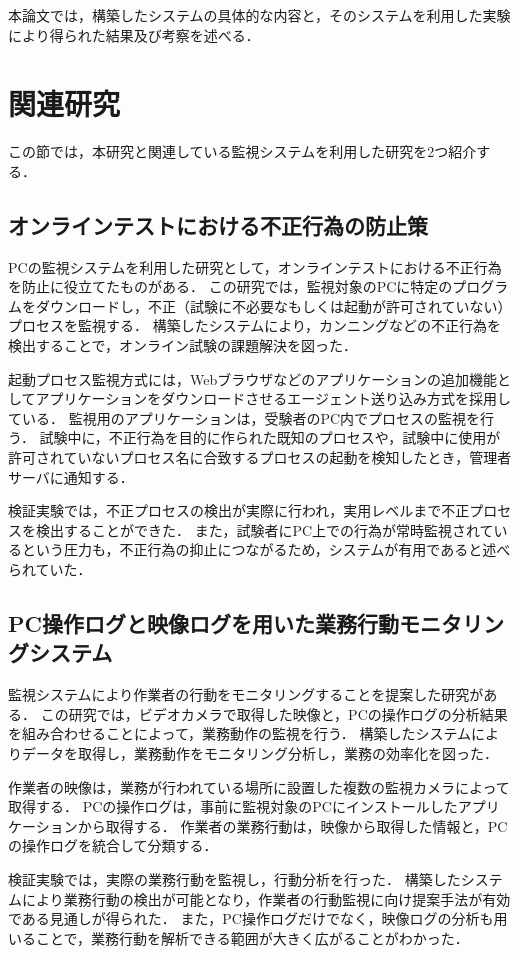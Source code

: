 本論文では，構築したシステムの具体的な内容と，そのシステムを利用した実験により得られた結果及び考察を述べる．

\section{関連研究}
この節では，本研究と関連している監視システムを利用した研究を2つ紹介する．

\subsection{オンラインテストにおける不正行為の防止策}
PCの監視システムを利用した研究として，オンラインテストにおける不正行為を防止に役立てたものがある．
この研究では，監視対象のPCに特定のプログラムをダウンロードし，不正（試験に不必要なもしくは起動が許可されていない）プロセスを監視する．
構築したシステムにより，カンニングなどの不正行為を検出することで，オンライン試験の課題解決を図った．

起動プロセス監視方式には，Webブラウザなどのアプリケーションの追加機能としてアプリケーションをダウンロードさせるエージェント送り込み方式を採用している．
監視用のアプリケーションは，受験者のPC内でプロセスの監視を行う．
試験中に，不正行為を目的に作られた既知のプロセスや，試験中に使用が許可されていないプロセス名に合致するプロセスの起動を検知したとき，管理者サーバに通知する．

検証実験では，不正プロセスの検出が実際に行われ，実用レベルまで不正プロセスを検出することができた．
また，試験者にPC上での行為が常時監視されているという圧力も，不正行為の抑止につながるため，システムが有用であると述べられていた．

\subsection{PC操作ログと映像ログを用いた業務行動モニタリングシステム}
監視システムにより作業者の行動をモニタリングすることを提案した研究がある．
この研究では，ビデオカメラで取得した映像と，PCの操作ログの分析結果を組み合わせることによって，業務動作の監視を行う．
構築したシステムによりデータを取得し，業務動作をモニタリング分析し，業務の効率化を図った．

作業者の映像は，業務が行われている場所に設置した複数の監視カメラによって取得する．
PCの操作ログは，事前に監視対象のPCにインストールしたアプリケーションから取得する．
作業者の業務行動は，映像から取得した情報と，PCの操作ログを統合して分類する．

検証実験では，実際の業務行動を監視し，行動分析を行った．
構築したシステムにより業務行動の検出が可能となり，作業者の行動監視に向け提案手法が有効である見通しが得られた．
また，PC操作ログだけでなく，映像ログの分析も用いることで，業務行動を解析できる範囲が大きく広がることがわかった．

